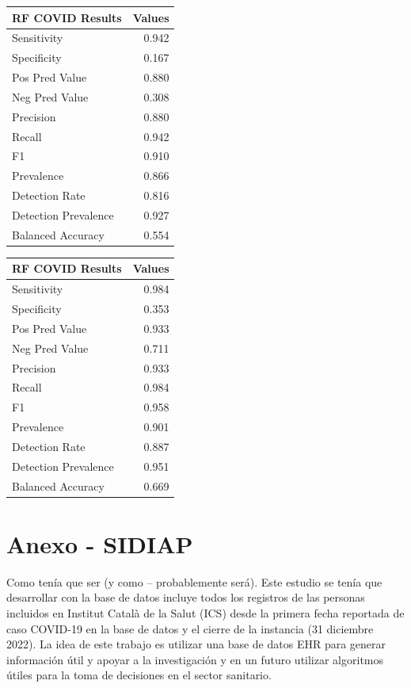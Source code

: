 \documentclass[
]{article}
\begin{document}
\begin{longtable}[]{@{}lr@{}}
\toprule()
RF COVID Results & Values \\
\midrule()
\endhead
Sensitivity & 0.942 \\
Specificity & 0.167 \\
Pos Pred Value & 0.880 \\
Neg Pred Value & 0.308 \\
Precision & 0.880 \\
Recall & 0.942 \\
F1 & 0.910 \\
Prevalence & 0.866 \\
Detection Rate & 0.816 \\
Detection Prevalence & 0.927 \\
Balanced Accuracy & 0.554 \\
\bottomrule()
\end{longtable}

\begin{longtable}[]{@{}lr@{}}
\toprule()
RF COVID Results & Values \\
\midrule()
\endhead
Sensitivity & 0.984 \\
Specificity & 0.353 \\
Pos Pred Value & 0.933 \\
Neg Pred Value & 0.711 \\
Precision & 0.933 \\
Recall & 0.984 \\
F1 & 0.958 \\
Prevalence & 0.901 \\
Detection Rate & 0.887 \\
Detection Prevalence & 0.951 \\
Balanced Accuracy & 0.669 \\
\bottomrule()
\end{longtable}

\pagebreak

\hypertarget{anexo---sidiap}{%
\section{Anexo - SIDIAP}\label{anexo---sidiap}}

Como tenía que ser (y como -- probablemente será). Este estudio se tenía
que desarrollar con la base de datos incluye todos los registros de las
personas incluidos en Institut Català de la Salut (ICS) desde la primera
fecha reportada de caso COVID-19 en la base de datos y el cierre de la
instancia (31 diciembre 2022). La idea de este trabajo es utilizar una
base de datos EHR para generar información útil y apoyar a la
investigación y en un futuro utilizar algoritmos útiles para la toma de
decisiones en el sector sanitario.
\end{document}
